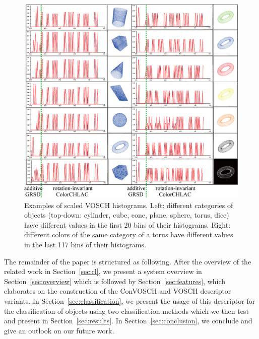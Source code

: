 \documentclass[conference]{sty/IEEEtran}
\begin{document}
\begin{figure}[htb!]
  \begin{center}
    \includegraphics[width=.99\columnwidth]{figures/colorCHLAC/artificial/normalized_hist.png}
    \caption{Examples of scaled VOSCH histograms.
Left: different categories of objects (top-down: cylinder, cube, cone, plane, sphere, torus, dice) 
have different values in the first 20 bins of their histograms.
Right: different colors of the same category of a torus have different values in the last 117 bins of their histograms.}
    \label{fig:grsd_cchlac}
  \end{center}
\end{figure}

The remainder of the paper is structured as following. After the overview of the related
work in Section~\ref{sec:rl}, we present a system overview in Section~\ref{sec:overview}
which is followed by Section~\ref{sec:features}, which elaborates on the construction of the
ConVOSCH and VOSCH descriptor variants. In Section~\ref{sec:classification}, we present the usage of this descriptor
for the classification of objects using two classification methods which we
then test and present in Section~\ref{sec:results}. In Section~\ref{sec:conclusion},
we conclude and give an outlook on our future work.
\end{document}
